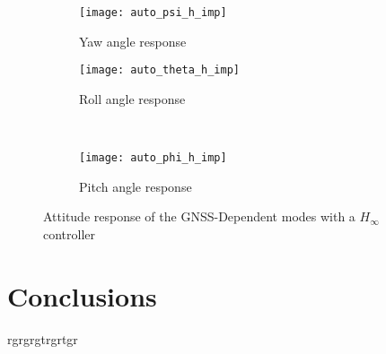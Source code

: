 \begin{figure}[H]
\begin{subfigure}{.5\linewidth}
\centering
\texttt{[image: auto\_psi\_h\_imp]}
\caption{Yaw angle response}
\label{fig:auto_psi_h_imp}
\end{subfigure}%
\begin{subfigure}{.5\linewidth}
\centering
\texttt{[image: auto\_theta\_h\_imp]}
\caption{Roll angle response}
\label{fig:auto_theta_h_imp}
\end{subfigure}\\[1ex]
\begin{subfigure}{\linewidth}
\centering
\texttt{[image: auto\_phi\_h\_imp]}
\caption{Pitch angle response}
\label{fig:auto_psi_h_imp}
\end{subfigure}
\caption{Attitude response of the GNSS-Dependent modes with a $H_\infty$ controller}
\label{fig:auto_h_imp}
\end{figure}




\section{Conclusions}
rgrgrgtrgrtgr